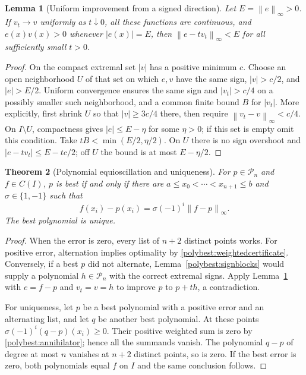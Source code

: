 \documentclass[11pt]{article}
\newcommand{\norm}[1]{\left\lVert #1\right\rVert}
\newtheorem{theorem}{Theorem}[section]
\newtheorem{lemma}[theorem]{Lemma}
\theoremstyle{remark}
\numberwithin{equation}{section}
\begin{document}
\begin{lemma}[Uniform improvement from a signed direction]
\label{polybest:improvement}
Let $E=\norm e_\infty>0$.  If $v_t\to v$ uniformly as $t\downarrow0$,
all these functions are continuous, and $e(x)v(x)>0$ whenever
$|e(x)|=E$, then $\norm{e-tv_t}_\infty<E$ for all sufficiently small
$t>0$.
\end{lemma}
\begin{proof}
On the compact extremal set $|v|$ has a positive minimum $c$.
Choose an open neighborhood $U$ of that set on which $e,v$ have the
same sign, $|v|>c/2$, and $|e|>E/2$.  Uniform convergence ensures the
same sign and $|v_t|>c/4$ on a possibly smaller such neighborhood,
and a common finite bound $B$ for $|v_t|$.  More explicitly, first
shrink $U$ so that $|v|\ge3c/4$ there, then require
$\norm{v_t-v}_\infty<c/4$.  On $I\setminus U$, compactness gives
$|e|\le E-\eta$ for some $\eta>0$; if this set is empty omit this
condition.  Take $tB<\min(E/2,\eta/2)$.  On $U$ there is no sign
overshoot and $|e-tv_t|\le E-tc/2$; off $U$ the bound is at most
$E-\eta/2$.
\end{proof}

\begin{theorem}[Polynomial equioscillation and uniqueness]
For $p\in\mathcal P_n$ and $f\in C(I)$, $p$ is best if and only if
there are $a\le x_0<\cdots<x_{n+1}\le b$ and $\sigma\in\{1,-1\}$
such that
\[
 f(x_i)-p(x_i)=\sigma(-1)^i\norm{f-p}_\infty.
\]
The best polynomial is unique.
\end{theorem}
\begin{proof}
When the error is zero, every list of $n+2$ distinct points works.
For positive error, alternation implies optimality by
\eqref{polybest:weightedcertificate}.  Conversely, if a best $p$ did not
alternate, Lemma~\ref{polybest:signblocks} would supply a polynomial
$h\in\mathcal P_n$ with the correct extremal signs.  Apply
Lemma~\ref{polybest:improvement} with $e=f-p$ and $v_t=v=h$ to improve
$p$ to $p+th$, a contradiction.

For uniqueness, let $p$ be a best polynomial with a positive error and
an alternating list, and let $q$ be another best polynomial.  At these
points $\sigma(-1)^i(q-p)(x_i)\ge0$.  Their positive weighted sum is
zero by \eqref{polybest:annihilator}; hence all the summands vanish.
The polynomial $q-p$ of degree at most $n$ vanishes at $n+2$ distinct
points, so is zero.  If the best error is zero, both polynomials equal
$f$ on $I$ and the same conclusion follows.
\end{proof}
\end{document}
